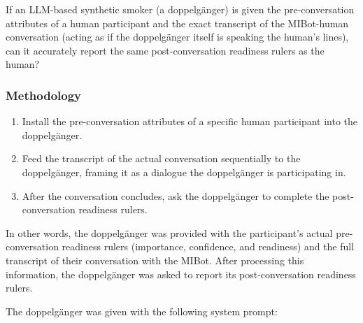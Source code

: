 If an LLM-based synthetic smoker (a doppelgänger) is given the pre-conversation attributes of a human participant and the exact transcript of the MIBot-human conversation (acting as if the doppelgänger itself is speaking the human's lines), can it accurately report the same post-conversation readiness rulers as the human?

\subsubsection{Methodology}
\begin{enumerate}
\item Install the pre-conversation attributes of a specific human participant into the doppelgänger.
\item Feed the transcript of the actual conversation sequentially to the doppelgänger, framing it as a dialogue the doppelgänger is participating in.
\item After the conversation concludes, ask the doppelgänger to complete the post-conversation readiness rulers.
\end{enumerate}

In other words, the doppelgänger was provided with the participant's actual pre-conversation readiness rulers (importance, confidence, and readiness) and the full transcript of their conversation with the MIBot. After processing this information, the doppelgänger was asked to report its post-conversation readiness rulers.

The doppelgänger was given with the following system prompt:


